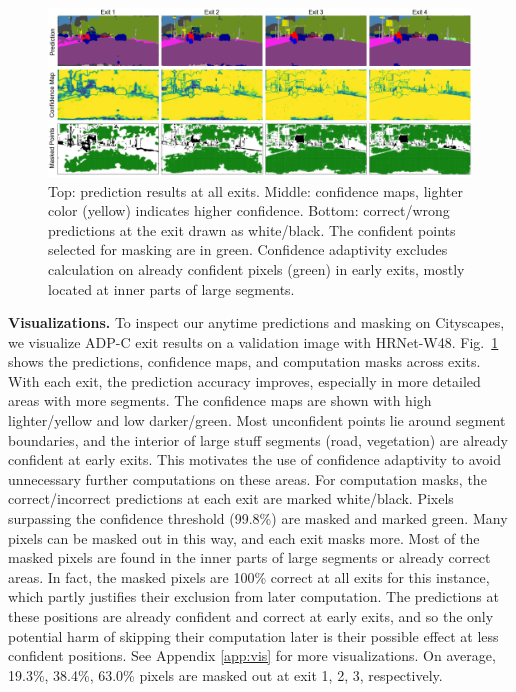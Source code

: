 \documentclass{article} %
\begin{document}
\begin{figure}[h]
\vspace{-2ex}
\includegraphics[width=\textwidth]{visualize_final.png}
\vspace{-2ex}
\caption{%
Top: prediction results at all exits.
Middle: confidence maps, lighter color (yellow) indicates higher confidence.
Bottom: correct/wrong predictions at the exit drawn as white/black.
The confident points selected for masking are in green.
Confidence adaptivity excludes calculation on already confident pixels (green) in early exits, mostly located at inner parts of large segments.}
\vspace{-1ex}
\label{fig:vis}
\end{figure}


\noindent\textbf{Visualizations.} 
To inspect our anytime predictions and masking on Cityscapes, we visualize ADP-C exit results on a validation image with HRNet-W48.
Fig.~\ref{fig:vis} shows the predictions, confidence maps, and computation masks across exits.
With each exit, the prediction accuracy improves, especially in more detailed areas with more segments.
The confidence maps are shown with high lighter/yellow and low darker/green.
Most unconfident points lie around segment boundaries, and the interior of large stuff segments (road, vegetation) are already confident at early exits.
This motivates the use of confidence adaptivity to avoid unnecessary further computations on these areas.
For computation masks, the correct/incorrect predictions at each exit are marked white/black.
Pixels surpassing the confidence threshold (99.8\%) are masked and marked green.
Many pixels can be masked out in this way, and each exit masks more.
Most of the masked pixels are found in the inner parts of large segments or already correct areas.
In fact, the masked pixels are 100\% correct at all exits for this instance, which partly justifies their exclusion from later computation.
The predictions at these positions are already confident and correct at early exits, and so the only potential harm of skipping their computation later is their possible effect at less confident positions.
See Appendix \ref{app:vis} for more visualizations. On average, 19.3\%, 38.4\%, 63.0\% pixels are masked out at exit 1, 2, 3, respectively.
\end{document}
